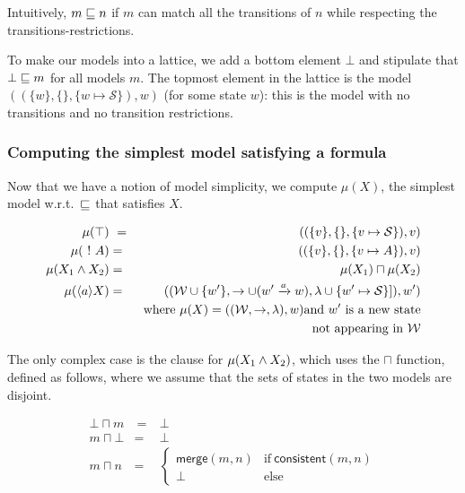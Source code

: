 \NI Intuitively, $m \sqsubseteq n$ if $m$ can match all the transitions of
$n$ while respecting the transitions-restrictions.

To make our models into a lattice, we add a bottom element $\bot$ and stipulate that $\bot
\sqsubseteq m$ for all models $m$.  The topmost element in the lattice is the
model $( (\{w\}, \{\}, \{w \mapsto \mathcal{S}\}), w)$ (for some state
$w$): this is the model with no transitions and no transition
restrictions.

\subsubsection{Computing the simplest  model satisfying a formula}

Now that we have a notion of model simplicity, we compute $\mu(X)$,
the simplest model w.r.t.~$\sqsubseteq$ that satisfies $X$.

\begin{eqnarray*}
  \mu (\top) &\ = \ & ( (\{v\}, \{\}, \{v \mapsto \mathcal{S}\}), v)  \\
  \mu (\ ! \  A) & = & ( (\{v\}, \{\}, \{v \mapsto A\}), v)  \\
  \mu (X_1 \land X_2) & = & \mu(X_1) \sqcap \mu(X_2)  \\
  \mu (\langle a \rangle X) 
     & = & ( (\mathcal{W} \cup \{w'\}, \rightarrow \cup (w' \xrightarrow{a} w), \lambda \cup \{w' \mapsto \mathcal{S}\}]), w')  \\
		& & \mbox{where }\mu(X) = ( (\mathcal{W}, \rightarrow, \lambda), w) \mbox{and } w' \mbox{ is a new state} \\
                &&  \mbox{not appearing in }\mathcal{W} 
\end{eqnarray*}

\NI The only complex case is the clause for $\mu (X_1 \land X_2)$,
which uses the $\sqcap$ function, defined as follows, where we assume
that the sets of states in the two models are disjoint.

\begin{eqnarray*}
  \bot \sqcap m  &\ =\ &  \bot  \\
  m \sqcap \bot      & = &  \bot  
     \\
  m \sqcap n 
     & = & 
  \begin{cases}
    \mathsf{merge}(m, n) & \text{if}\ \mathsf{consistent}(m, n) \\
    \bot & \text{else}
  \end{cases}
\end{eqnarray*}

